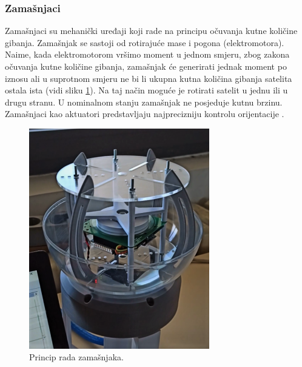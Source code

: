 \documentclass[times, utf8, diplomski, numeric]{templates/template}
\begin{document}
{{{            \subsubsection{Zamašnjaci }{
                Zamašnjaci su mehanički uređaji koji rade na principu očuvanja kutne količine gibanja. Zamašnjak se sastoji od rotirajuće mase i pogona (elektromotora). Naime, kada elektromotorom vršimo moment u jednom smjeru, zbog zakona očuvanja kutne količine gibanja, zamašnjak će generirati jednak moment po iznosu ali u suprotnom smjeru ne bi li ukupna kutna količina gibanja satelita ostala ista (vidi sliku \ref{fig:zamasnjak_fig}). Na taj način moguće je rotirati satelit u jednu ili u drugu stranu. U nominalnom stanju zamašnjak ne posjeduje kutnu brzinu. Zamašnjaci kao aktuatori predstavljaju najprecizniju kontrolu orijentacije \cite{adcsKnjiga}.

                \begin{figure}[htb]
                \centering
                \includegraphics[width=0.7\textwidth]{images/zamasnjak.png}
                \caption{Princip rada zamašnjaka.}
                \label{fig:zamasnjak_fig}
                \end{figure}

}}}}
\end{document}
